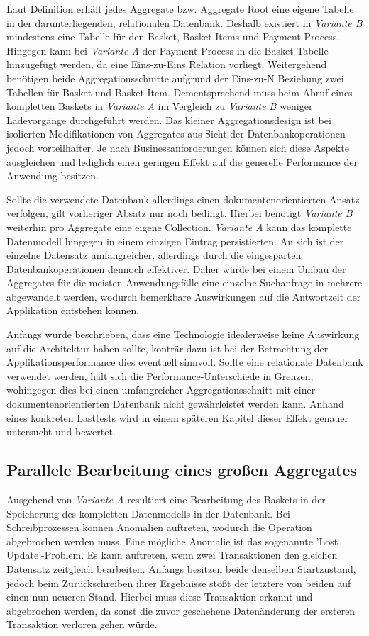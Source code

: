Laut Definition erhält jedes Aggregate bzw. Aggregate Root eine eigene Tabelle in der darunterliegenden, relationalen Datenbank. Deshalb existiert in \emph{Variante B} mindestens eine Tabelle für den Basket, Basket-Items und Payment-Process. Hingegen kann bei \emph{Variante A} der Payment-Process in die Basket-Tabelle hinzugefügt werden, da eine Eins-zu-Eins Relation vorliegt. Weitergehend benötigen beide Aggregationsschnitte aufgrund der Eins-zu-N Beziehung zwei Tabellen für Basket und Basket-Item. Dementsprechend muss beim Abruf eines kompletten Baskets in \emph{Variante A} im Vergleich zu \emph{Variante B} weniger Ladevorgänge durchgeführt werden. Das kleiner Aggregationsdesign ist bei isolierten Modifikationen von Aggregates aus Sicht der Datenbankoperationen jedoch vorteilhafter. Je nach Businessanforderungen können sich diese Aspekte ausgleichen und lediglich einen geringen Effekt auf die generelle Performance der Anwendung besitzen.

Sollte die verwendete Datenbank allerdings einen dokumentenorientierten Ansatz verfolgen, gilt vorheriger Absatz nur noch bedingt. Hierbei benötigt \emph{Variante B} weiterhin pro Aggregate eine eigene \gls{Collection}. \emph{Variante A} kann das komplette Datenmodell hingegen in einem einzigen Eintrag persistierten. An sich ist der einzelne Datensatz umfangreicher, allerdings durch die eingesparten Datenbankoperationen dennoch effektiver. Daher würde bei einem Umbau der Aggregates für die meisten Anwendungsfälle eine einzelne Suchanfrage in mehrere abgewandelt werden, wodurch bemerkbare Auswirkungen auf die Antwortzeit der Applikation entstehen können. 

Anfangs wurde beschrieben, dass eine Technologie idealerweise keine Auswirkung auf die Architektur haben sollte, konträr dazu ist bei der Betrachtung der Applikationsperformance dies eventuell sinnvoll. Sollte eine relationale Datenbank verwendet werden, hält sich die Performance-Unterschiede in Grenzen, wohingegen dies bei einen umfangreicher Aggregationsschnitt mit einer dokumentenorientierten Datenbank nicht gewährleistet werden kann. Anhand eines konkreten Lasttests wird in einem späteren Kapitel dieser Effekt genauer untersucht und bewertet.

\subsection{Parallele Bearbeitung eines großen Aggregates}

Ausgehend von \emph{Variante A} resultiert eine Bearbeitung des Baskets in der Speicherung des kompletten Datenmodells in der Datenbank. Bei Schreibprozessen können Anomalien auftreten, wodurch die Operation abgebrochen werden muss. Eine mögliche Anomalie ist das sogenannte 'Lost Update'-Problem. Es kann auftreten, wenn zwei Transaktionen den gleichen Datensatz zeitgleich bearbeiten. Anfangs besitzen beide denselben Startzustand, jedoch beim Zurückschreiben ihrer Ergebnisse stößt der letztere von beiden auf einen nun neueren Stand. Hierbei muss diese Transaktion erkannt und abgebrochen werden, da sonst die zuvor geschehene Datenänderung der ersteren Transaktion verloren gehen würde.

